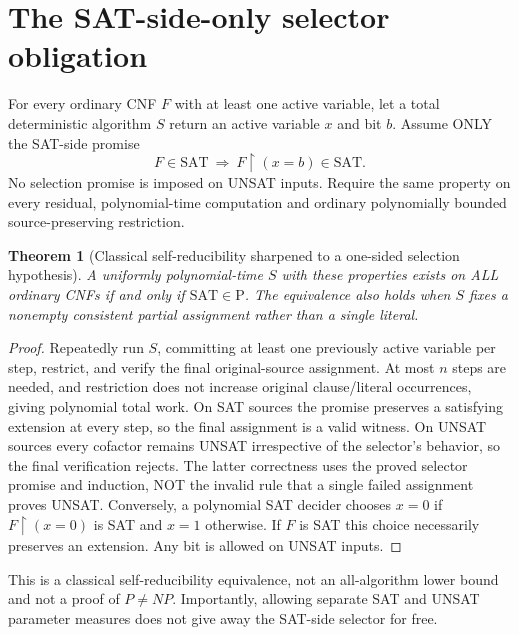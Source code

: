 \documentclass[11pt]{article}
\newtheorem{theorem}{Theorem}
\begin{document}
\section{The SAT-side-only selector obligation}
For every ordinary CNF $F$ with at least one active variable, let a total deterministic algorithm $S$ return an active variable $x$ and bit $b$. Assume ONLY the SAT-side promise
\[
  F\in\mathrm{SAT}\ \Longrightarrow\ F\restriction(x=b)\in\mathrm{SAT}.
\]
No selection promise is imposed on UNSAT inputs. Require the same property on every residual, polynomial-time computation and ordinary polynomially bounded source-preserving restriction.
\begin{theorem}[Classical self-reducibility sharpened to a one-sided selection hypothesis]
A uniformly polynomial-time $S$ with these properties exists on ALL ordinary CNFs if and only if $\mathrm{SAT}\in\mathrm P$. The equivalence also holds when $S$ fixes a nonempty consistent partial assignment rather than a single literal.
\end{theorem}
\begin{proof}
Repeatedly run $S$, committing at least one previously active variable per step, restrict, and verify the final original-source assignment. At most $n$ steps are needed, and restriction does not increase original clause/literal occurrences, giving polynomial total work. On SAT sources the promise preserves a satisfying extension at every step, so the final assignment is a valid witness. On UNSAT sources every cofactor remains UNSAT irrespective of the selector's behavior, so the final verification rejects. The latter correctness uses the proved selector promise and induction, NOT the invalid rule that a single failed assignment proves UNSAT. Conversely, a polynomial SAT decider chooses $x=0$ if $F\restriction(x=0)$ is SAT and $x=1$ otherwise. If $F$ is SAT this choice necessarily preserves an extension. Any bit is allowed on UNSAT inputs.
\end{proof}
This is a classical self-reducibility equivalence, not an all-algorithm lower bound and not a proof of $P\ne NP$. Importantly, allowing separate SAT and UNSAT parameter measures does not give away the SAT-side selector for free.
\end{document}
